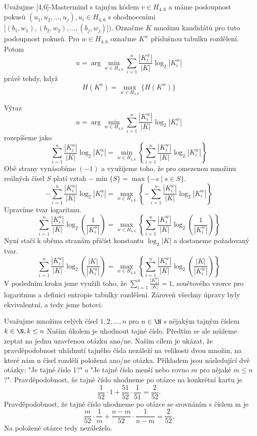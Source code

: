 \begin{veta} \label{ekvivalencemaxentropy}
    Uvažujme [4,6]-Mastermind s tajným kódem $v\in H_{4,6}$ a máme posloupnost pokusů $\left(u_1, u_2, \dots, u_j\right), u_i \in H_{4,6}$ s ohodnoceními $\lbrack (b_1,w_1) , (b_2,w_2), \dots, (b_j,w_j)\rbrack)$. Označme $K$ množinu kandidátů pro tuto posloupnost pokusů. Pro $w \in H_{4,6}$ označme $K^w$ příslušnou tabulku rozdělení. Potom 
    \[u = \arg\min_{w \in H_{4,6}} \sum_{i=1}^n \frac{|K^w_i|}{|K|}\log_2|K^w_i|\]
    právě tehdy, když 
    \[H(K^u) = \max_{w \in H_{4,6}} \{ H(K^w) \}\]
    
\end{veta}
\begin{dukaz}
     Výraz 
  \[
      u = \arg\min_{w \in H_{4,6}} \sum_{i=1}^n \frac{|K^w_i|}{|K|}\log_2|K^w_i| 
      \]
      rozepíšeme jako
\[
      \sum_{i=1}^{n} \frac{|K^u_i|}{|K|} \log_2|K^u_i| 
      = \min_{w \in H_{4,6}} \left\{ \sum_{i=1}^n \frac{|K^w_i|}{|K|}\log_2|K^w_i| \right\}  
      \]
      Obě strany vynásobíme $(-1)$ a využijeme toho, že pro omezenou množinu reálných čísel $S$ platí vztah $-\min\{S\} = \max\{-s \mid s \in S\}$.
\[
      -\sum_{i=1}^n \frac{|K^u_i|}{|K|}\log_2|K^u_i| 
      = \max_{w \in H_{4,6}} \left\{ -\sum_{i=1}^n \frac{|K^w_i|}{|K|}\log_2|K^w_i| \right\}  
\]
Upravíme tvar logaritmu.
\[
      \sum_{i=1}^n \frac{|K^u_i|}{|K|}\log_2\left( \frac{1}{|K^u_i|} \right) 
      = \max_{w \in H_{4,6}} \left\{ \sum_{i=1}^n \frac{|K^w_i|}{|K|}\log_2\left( \frac{1}{|K^w_i|} \right) \right\} 
\]
Nyní stačí k oběma stranám přičíst konstantu $\log_2|K|$ a dostaneme požadovaný tvar. 
\[
      \sum_{i=1}^n \frac{|K^u_i|}{|K|}\log_2\left( \frac{|K|}{|K^u_i|} \right) 
      = \max_{w \in H_{4,6}} \left\{ \sum_{i=1}^n \frac{|K^w_i|}{|K|}\log_2\left( \frac{|K|}{|K^w_i|} \right) \right\} 
\]
V posledním kroku jsme využili toho, že $\sum_{i=1}^n \frac{|K^u_i|}{|K|} = 1$, součtového vzorce pro logaritmus a definici entropie tabulky rozdělení. Zároveň všechny úpravy byly ekvivalentní, a tedy jsme hotovi.
\end{dukaz}

\begin{prikl}\label{prdvecasti}
    Uvažujme množinu celých čísel $1,2,\dots, n$ pro $n \in \N $ s nějakým tajným číslem $k \in \N, k\leq n$ Naším úkolem je uhodnout tajné číslo. Předtím se ale můžeme zeptat na jednu uzavřenou otázku ano/ne. Naším cílem je ukázat, že pravděpodobnost uhádnutí tajného čísla nezáleží na velikosti dvou množin, na které nám n čísel rozdělí položená ano/ne otázka. Příkladem jsou následující dvě otázky: "Je tajné číslo 1?" a "Je tajné číslo menší nebo rovno $m$ pro nějaké $m \leq n$?".
    Pravděpodobnost, že tajné číslo uhodneme po otázce na konkrétní kartu je 
    \[\frac{1}{52} \cdot 1 + \frac{51}{52} \cdot \frac{1}{51} = \frac{2}{52}.\] 
    Pravděpodobnost, že tajné číslo uhodneme po otázce se srovnáním s číslem m je 
    \[\frac{m}{52} \cdot \frac{1}{m} + \frac{n-m}{52} \cdot \frac{1}{n-m} = \frac{2}{52}.\] 
    Na položené otázce tedy nezáleželo.
\end{prikl}

